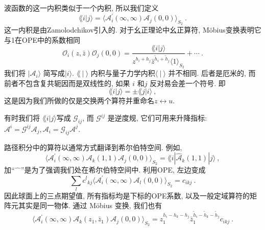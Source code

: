 波函数的这一内积类似于一个内积, 所以我们定义
\begin{equation}
	\lAngle i \vert j\rangle = \bigl\langle\mathscr{A}_{i}^{\prime}(\infty, \infty) \mathscr{A}_{j}(0,0)\bigr\rangle_{S_{2}} \:. \label{6.7.10}
\end{equation}
这一内积是由Zamolodchikov引入的. 对于幺正理论中幺正算符, Möbius变换表明它与1在OPE中的系数相同
\begin{equation}
	\mathcal{O}_{i}(z, \bar{z}) \mathcal{O}_{j}(0,0)=\frac{\lAngle i \vert j\rangle}{z^{h_{i}+h_{j}} \bar{z}^{\tilde{h}_{i}+\tilde{h}_{j}}\langle 1\rangle_{S_{2}}}+\cdots \:. \label{6.7.11}
\end{equation}
我们将 $|\mathscr{A}_{i}\rangle$ 简写成$|i\rangle$.  $\lAngle \: |\: \rangle$ 内积与量子力学内积$\langle\: |\:\rangle$ 并不相同. 
后者是厄米的, 而前者不包含复共轭因而是双线性的, 如果 $i$ 和$j$ 反对易会差一个符号. 即
\begin{equation}
	\lAngle i \vert j\rangle= \pm \lAngle j \vert i\rangle \:, \label{6.7.12}
\end{equation}
这是因为我们所做的仅是交换两个算符并重命名$z\leftrightarrow u$.

有时我们将 $\lAngle i \vert j\rangle$写成 $\mathscr{G}_{i j}$, 而 $\mathscr{G}^{i j}$ 是逆度规, 它们可用来升降指标: 
$\mathscr{A}^{i}=\mathscr{G}^{i j} \mathscr{A}_{j}, \mathscr{A}_{i}=\mathscr{G}_{i j} \mathscr{A}^{j}$. 

路径积分中的算符以通常方式翻译到希尔伯特空间. 例如,
\begin{equation}
	\bigl\langle\mathscr{A}_{i}^{\prime}(\infty, \infty) \mathscr{A}_{k}(1,1) \mathscr{A}_{j}(0,0)\bigr\rangle_{S_{2}}=
	\lAngle i|\hat{\mathscr{A}}_{k}(1,1)| j\rangle \:, \label{6.7.13}
\end{equation}
加``$\hat{\phantom{m}}$''是为了强调我们处在希尔伯特空间中. 利用OPE, 左边变成
\begin{equation}
	\sum_{l} c^{l}{}_{kj}\bigl\langle\mathscr{A}_{i}^{\prime}(\infty, \infty) \mathscr{A}_{l}(0,0)\bigr\rangle_{S_{2}}=c_{i k j} \:. 
	\label{6.7.14}
\end{equation}
因此球面上的三点期望值, 所有指标均是下标的OPE系数, 以及一般定域算符的矩阵元其实是同一物体. 通过 M\"{o}bius 变换, 我们也有
\begin{equation}
	\bigl\langle\mathscr{A}_{i}^{\prime}(\infty, \infty) \mathscr{A}_{k}(z_{1}, \bar{z}_{1}) 
	\mathscr{A}_{j}(0,0)\bigr\rangle_{S_{2}} = z_{1}^{h_{i}-h_{k}-h_{j}} \bar{z}_{1}^{\tilde{h}_{i}-\tilde{h}_{k}-\tilde{h}_{j}} 
	c_{i k j} \:. \label{6.7.15}
\end{equation}

